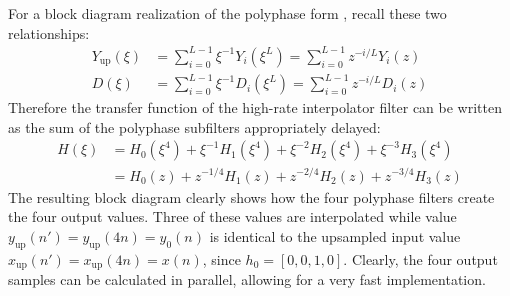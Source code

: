 For a block diagram realization of the polyphase form , recall these two relationships:
\begin{align*}
  Y_{\text{up}}(\xi) &= \sum_{i=0}^{L-1}\xi^{-1}Y_i(\xi^L) = \sum_{i=0}^{L-1}z^{-i/L}Y_i(z) \\
  D(\xi) &= \sum_{i=0}^{L-1}\xi^{-1}D_i(\xi^L) = \sum_{i=0}^{L-1}z^{-i/L}D_i(z)
\end{align*}
Therefore the transfer function of the high-rate interpolator filter can be written as the sum of the polyphase subfilters appropriately delayed:
\begin{align*}
  H(\xi) &= H_0(\xi^4) + \xi^{-1}H_1(\xi^4) + \xi^{-2}H_2(\xi^4) + \xi^{-3}H_3(\xi^4) \\
  &= H_0(z) + z^{-1/4}H_1(z) + z^{-2/4}H_2(z) + z^{-3/4}H_3(z)
\end{align*}
The resulting block diagram clearly shows how the four polyphase filters create the four output values.
Three of these values are interpolated while value $y_{\text{up}}(n') = y_{\text{up}}(4n) = y_0(n)$ is identical to the upsampled input value $x_{\text{up}}(n') = x_{\text{up}}(4n) = x(n)$, since $h_0=[0,0,1,0]$.
Clearly, the four output samples can be calculated in parallel, allowing for a very fast implementation.
\begin{center}
\end{center}


